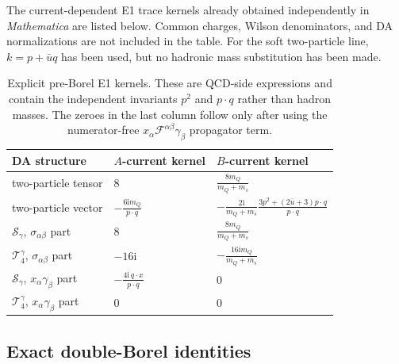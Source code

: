 \documentclass[11pt]{article}
\newcommand{\ii}{\mathrm{i}}
\newcommand{\Mathematica}{\textit{Mathematica}}
\begin{document}
The current-dependent E1 trace kernels already obtained independently in
\Mathematica{} are listed below.  Common charges, Wilson denominators, and DA
normalizations are not included in the table.  For the soft two-particle
line, $k=p+\bar u q$ has been used, but no hadronic mass substitution has
been made.
\begin{table}[H]
 \centering
 \small
 \begin{tabular}{p{}p{}p{}}
  \toprule
  DA structure & $A$-current kernel & $B$-current kernel\\
  \midrule
  two-particle tensor
   & $8$
   & $\displaystyle\frac{8m_Q}{m_Q+m_s}$\\[4pt]
  two-particle vector
   & $\displaystyle-\frac{6\ii m_Q}{p\cdot q}$
   & $\displaystyle-\frac{2\ii}{m_Q+m_s}
      \frac{3p^2+(2\bar u+3)p\cdot q}{p\cdot q}$\\[7pt]
  $\mathcal S_\gamma$, $\sigma_{\alpha\beta}$ part
   & $8$
   & $\displaystyle\frac{8m_Q}{m_Q+m_s}$\\[4pt]
  $\mathcal T_4^\gamma$, $\sigma_{\alpha\beta}$ part
   & $-16\ii$
   & $\displaystyle-\frac{16\ii m_Q}{m_Q+m_s}$\\[4pt]
  $\mathcal S_\gamma$, $x_\alpha\gamma_\beta$ part
   & $\displaystyle-\frac{4\ii\,q\cdot x}{p\cdot q}$
   & $0$\\[7pt]
  $\mathcal T_4^\gamma$, $x_\alpha\gamma_\beta$ part
   & $0$
   & $0$\\
  \bottomrule
 \end{tabular}
 \caption{Explicit pre-Borel E1 kernels.  These are QCD-side expressions and
 contain the independent invariants $p^2$ and $p\cdot q$ rather than hadron
 masses.  The zeroes in the last column follow only after using the
 numerator-free $x_\alpha\mathcal F^{\alpha\beta}\gamma_\beta$ propagator
 term.}
 \label{tab:explicit-preborel-kernels}
\end{table}

\subsection{Exact double-Borel identities}
\end{document}
